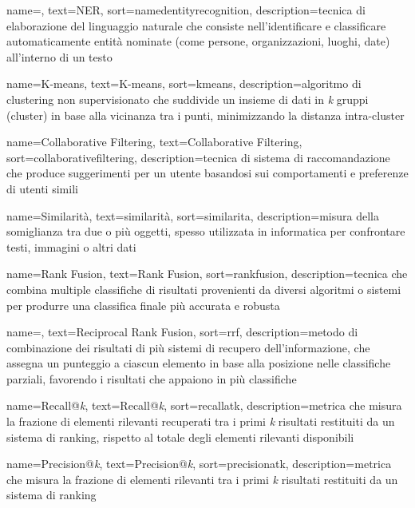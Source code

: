  {
    name=,
    text=NER,
    sort=namedentityrecognition,
    description={tecnica di elaborazione del linguaggio naturale che consiste nell'identificare e classificare automaticamente entità nominate (come persone, organizzazioni, luoghi, date) all'interno di un testo}
}

 {
    name=K-means,
    text=K-means,
    sort=kmeans,
    description={algoritmo di clustering non supervisionato che suddivide un insieme di dati in \emph{k} gruppi (cluster) in base alla vicinanza tra i punti, minimizzando la distanza intra-cluster}
}

 {
    name=Collaborative Filtering,
    text=Collaborative Filtering,
    sort=collaborativefiltering,
    description={tecnica di sistema di raccomandazione che produce suggerimenti per un utente basandosi sui comportamenti e preferenze di utenti simili}
}

 {
    name=Similarità,
    text=similarità,
    sort=similarita,
    description={misura della somiglianza tra due o più oggetti, spesso utilizzata in informatica per confrontare testi, immagini o altri dati}
}

 {
    name=Rank Fusion,
    text=Rank Fusion,
    sort=rankfusion,
    description={tecnica che combina multiple classifiche di risultati provenienti da diversi algoritmi o sistemi per produrre una classifica finale più accurata e robusta}
}

 {
    name=,
    text=Reciprocal Rank Fusion,
    sort=rrf,
    description={metodo di combinazione dei risultati di più sistemi di recupero dell'informazione, che assegna un punteggio a ciascun elemento in base alla posizione nelle classifiche parziali, favorendo i risultati che appaiono in più classifiche}
}

 {
    name=Recall@\emph{k},
    text=Recall@\emph{k},
    sort=recallatk,
    description={metrica che misura la frazione di elementi rilevanti recuperati tra i primi \emph{k} risultati restituiti da un sistema di ranking, rispetto al totale degli elementi rilevanti disponibili}
}

 {
    name=Precision@\emph{k},
    text=Precision@\emph{k},
    sort=precisionatk,
    description={metrica che misura la frazione di elementi rilevanti tra i primi \emph{k} risultati restituiti da un sistema di ranking}
}


